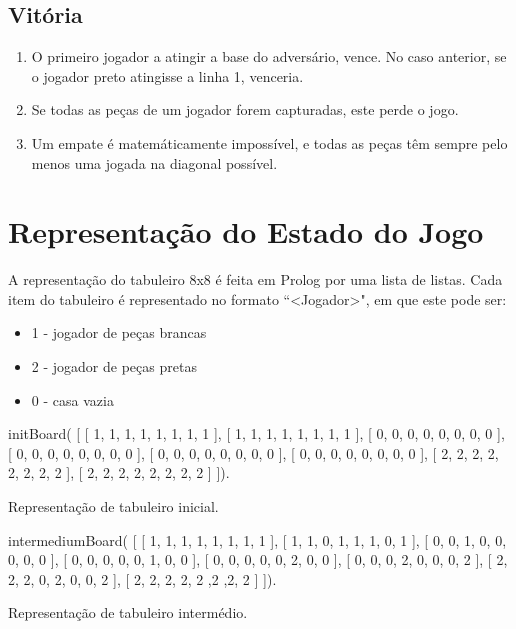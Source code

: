 \documentclass[15pt,a4paper]{article}
\begin{document}
\subsection{Vitória}
\begin{enumerate}
\item O primeiro jogador a atingir a base do adversário, vence. No caso anterior, se o jogador preto atingisse a linha 1, venceria.
\item Se todas as peças de um jogador forem capturadas, este perde o jogo.
\item Um empate é matemáticamente impossível, e todas as peças têm sempre pelo menos uma jogada na diagonal possível.
\end{enumerate}


 
\section{Representação do Estado do Jogo}

A representação do tabuleiro 8x8 é feita em Prolog por uma lista de listas.
Cada item do tabuleiro é representado no formato ``<Jogador>", em que este pode ser:
\begin{itemize}
\item 1 - jogador de peças brancas
\item 2 - jogador de peças pretas
\item 0 - casa vazia
\end{itemize}

\begin{code}[H]
	\begin{verbatimtab}
initBoard(
	[
		[ 1, 1, 1, 1, 1, 1, 1, 1 ],
		[ 1, 1, 1, 1, 1, 1, 1, 1 ],
		[ 0, 0, 0, 0, 0, 0, 0, 0 ],
		[ 0, 0, 0, 0, 0, 0, 0, 0 ],
		[ 0, 0, 0, 0, 0, 0, 0, 0 ],
		[ 0, 0, 0, 0, 0, 0, 0, 0 ],
		[ 2, 2, 2, 2, 2, 2, 2, 2 ],
		[ 2, 2, 2, 2, 2, 2, 2, 2 ]
	]).
\end{verbatimtab}
\caption{Representação de tabuleiro inicial.}
\end{code}


\begin{code}[H]
	\begin{verbatimtab}

intermediumBoard(
	[
		[ 1, 1, 1, 1, 1, 1, 1, 1 ],
		[ 1, 1, 0, 1, 1, 1, 0, 1 ],
		[ 0, 0, 1, 0, 0, 0, 0, 0 ],
		[ 0, 0, 0, 0, 0, 1, 0, 0 ],
		[ 0, 0, 0, 0, 0, 2, 0, 0 ],
		[ 0, 0, 0, 2, 0, 0, 0, 2 ],
		[ 2, 2, 2, 0, 2, 0, 0, 2 ],
		[ 2, 2, 2, 2, 2 ,2 ,2, 2 ]
	]).
\end{verbatimtab}
\caption{Representação de tabuleiro intermédio.}
\end{code}
\end{document}
